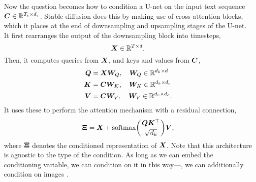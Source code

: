 Now the question becomes how to condition a U-net on the input text sequence $\bm{C} \in \mathbb{R}^{T_c
        \times d_c}$. Stable diffusion \citep{rombach2022high} does this by making use of cross-attention
blocks, which it places at the end of downsampling and upsampling stages of the U-net. It first
rearranges the output of the downsampling block into timesteps, \[
    \bm{X} \in \mathbb{R}^{T \times d}.
\]
Then, it computes queries from $\bm{X}$, and keys and values from $\bm{C}$,
\begin{align*}
    \bm{Q} & = \bm{X} \bm{W}_Q, \quad \bm{W}_Q \in \mathbb{R}^{d_k \times d}    \\
    \bm{K} & = \bm{C} \bm{W}_K, \quad \bm{W}_K \in \mathbb{R}^{d_k \times d_c}  \\
    \bm{V} & = \bm{C} \bm{W}_V, \quad \bm{W}_V \in \mathbb{R}^{d_v \times d_c}.
\end{align*}
It uses these to perform the attention mechanism with a residual connection, \[
    \mat{\Xi} = \mat{X} + \mathrm{softmax} \lft( \frac{\mat{Q} \transpose{\mat{K}}}{\sqrt{d_k}} \rgt) \mat{V},
\]
where $\bm{\Xi}$ denotes the conditioned representation of $\bm{X}$. Note that this architecture
is agnostic to the type of the condition. As long as we can embed the conditioning variable, we can
condition on it in this way---\eg, we can additionally condition on images \citep{ye2023ip}.
